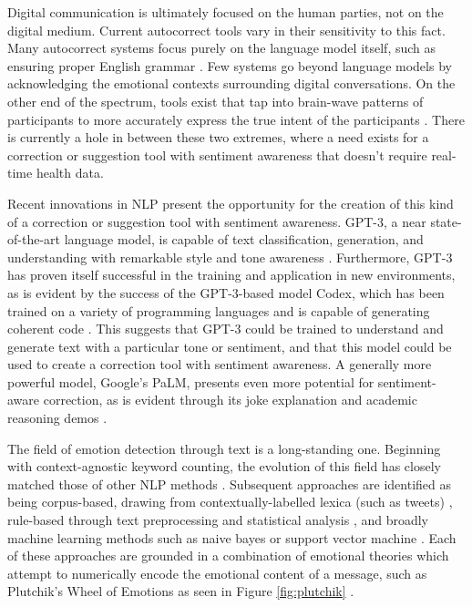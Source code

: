 \documentclass[acmsmall,screen,authorversion,nonacm]{acmart}
\begin{document}
Digital communication is ultimately focused on the human parties, not on the digital medium. Current autocorrect tools vary in their sensitivity to this fact. Many autocorrect systems focus purely on the language model itself, such as ensuring proper English grammar \cite{shin_kim_2022}. Few systems go beyond language models by acknowledging the emotional contexts surrounding digital conversations. On the other end of the spectrum, tools exist that tap into brain-wave patterns of participants to more accurately express the true intent of the participants \cite{brain_activity_autocorrect}. There is currently a hole in between these two extremes, where a need exists for a correction or suggestion tool with sentiment awareness that doesn't require real-time health data.

Recent innovations in NLP present the opportunity for the creation of this kind of a correction or suggestion tool with sentiment awareness. GPT-3, a near state-of-the-art language model, is capable of text classification, generation, and understanding with remarkable style and tone awareness \cite{Brown_2020}. Furthermore, GPT-3 has proven itself successful in the training and application in new environments, as is evident by the success of the GPT-3-based model Codex, which has been trained on a variety of programming languages and is capable of generating coherent code \cite{Chen_Tworek._2021}. This suggests that GPT-3 could be trained to understand and generate text with a particular tone or sentiment, and that this model could be used to create a correction tool with sentiment awareness. A generally more powerful model, Google's PaLM, presents even more potential for sentiment-aware correction, as is evident through its joke explanation and academic reasoning demos \cite{Chowdhery_2022}.

The field of emotion detection through text is a long-standing one. Beginning with context-agnostic keyword counting, the evolution of this field has closely matched those of other NLP methods \cite{kao2009towards}. Subsequent approaches are identified as being corpus-based, drawing from contextually-labelled lexica (such as tweets) \cite{plaza2020emoevent}, rule-based through text preprocessing and statistical analysis \cite{asghar2017lexicon}, and broadly machine learning methods such as naive bayes or support vector machine \cite{hasan2019automatic}. Each of these approaches are grounded in a combination of emotional theories which attempt to numerically encode the emotional content of a message, such as Plutchik’s Wheel of Emotions as seen in Figure \ref{fig:plutchik} \cite{plutchik1980general}.
\end{document}

